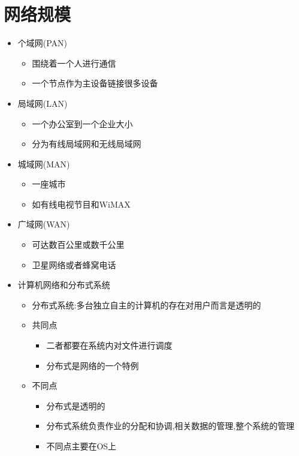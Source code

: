 \documentclass[a4paper,12pt,notitlepage]{article}
\begin{document}
\section{网络规模}
\begin{itemize}
	\item 个域网(PAN)
	\begin{itemize}
		\item 围绕着一个人进行通信
		\item 一个节点作为主设备链接很多设备
	\end{itemize}
	\item 局域网(LAN)
	\begin{itemize}
		\item 一个办公室到一个企业大小
		\item 分为有线局域网和无线局域网
	\end{itemize}
	\item 城域网(MAN)
	\begin{itemize}
		\item 一座城市
		\item 如有线电视节目和WiMAX
	\end{itemize}
	\item 广域网(WAN)
	\begin{itemize}
		\item 可达数百公里或数千公里
		\item 卫星网络或者蜂窝电话
	\end{itemize}
	\item 计算机网络和分布式系统
	\begin{itemize}
		\item 分布式系统:多台独立自主的计算机的存在对用户而言是透明的
		\item 共同点
		\begin{itemize}
			\item 二者都要在系统内对文件进行调度
			\item 分布式是网络的一个特例
		\end{itemize}
		\item 不同点
		\begin{itemize}
			\item 分布式是透明的
			\item 分布式系统负责作业的分配和协调,相关数据的管理,整个系统的管理
			\item 不同点主要在OS上
		\end{itemize}
	\end{itemize}
\end{itemize}
\end{document}
